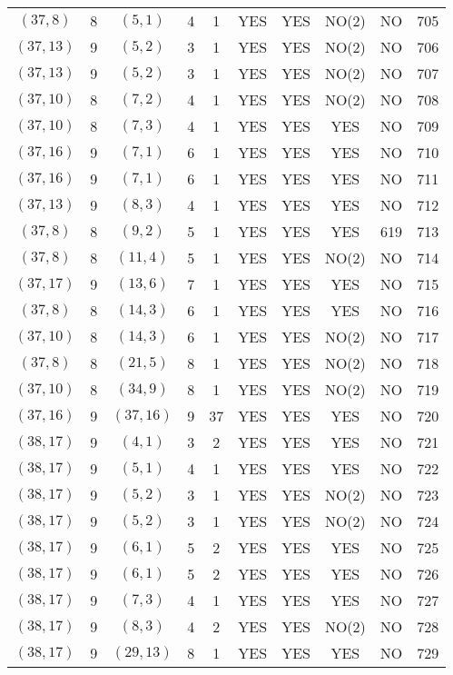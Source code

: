 \begin{longtable}{|c|c|c|c|c|c|c|c|c|c|}
$(37, 8)$ & 8 & $(5, 1)$ & 4 & 1 & YES & YES & NO(2) & NO & 705\\
$(37, 13)$ & 9 & $(5, 2)$ & 3 & 1 & YES & YES & NO(2) & NO & 706\\
$(37, 13)$ & 9 & $(5, 2)$ & 3 & 1 & YES & YES & NO(2) & NO & 707\\
$(37, 10)$ & 8 & $(7, 2)$ & 4 & 1 & YES & YES & NO(2) & NO & 708\\
$(37, 10)$ & 8 & $(7, 3)$ & 4 & 1 & YES & YES & YES & NO & 709\\
$(37, 16)$ & 9 & $(7, 1)$ & 6 & 1 & YES & YES & YES & NO & 710\\
$(37, 16)$ & 9 & $(7, 1)$ & 6 & 1 & YES & YES & YES & NO & 711\\
$(37, 13)$ & 9 & $(8, 3)$ & 4 & 1 & YES & YES & YES & NO & 712\\
$(37, 8)$ & 8 & $(9, 2)$ & 5 & 1 & YES & YES & YES & 619 & 713\\
$(37, 8)$ & 8 & $(11, 4)$ & 5 & 1 & YES & YES & NO(2) & NO & 714\\
$(37, 17)$ & 9 & $(13, 6)$ & 7 & 1 & YES & YES & YES & NO & 715\\
$(37, 8)$ & 8 & $(14, 3)$ & 6 & 1 & YES & YES & YES & NO & 716\\
$(37, 10)$ & 8 & $(14, 3)$ & 6 & 1 & YES & YES & NO(2) & NO & 717\\
$(37, 8)$ & 8 & $(21, 5)$ & 8 & 1 & YES & YES & NO(2) & NO & 718\\
$(37, 10)$ & 8 & $(34, 9)$ & 8 & 1 & YES & YES & NO(2) & NO & 719\\
$(37, 16)$ & 9 & $(37, 16)$ & 9 & 37 & YES & YES & YES & NO & 720\\
$(38, 17)$ & 9 & $(4, 1)$ & 3 & 2 & YES & YES & YES & NO & 721\\
$(38, 17)$ & 9 & $(5, 1)$ & 4 & 1 & YES & YES & YES & NO & 722\\
$(38, 17)$ & 9 & $(5, 2)$ & 3 & 1 & YES & YES & NO(2) & NO & 723\\
$(38, 17)$ & 9 & $(5, 2)$ & 3 & 1 & YES & YES & NO(2) & NO & 724\\
$(38, 17)$ & 9 & $(6, 1)$ & 5 & 2 & YES & YES & YES & NO & 725\\
$(38, 17)$ & 9 & $(6, 1)$ & 5 & 2 & YES & YES & YES & NO & 726\\
$(38, 17)$ & 9 & $(7, 3)$ & 4 & 1 & YES & YES & YES & NO & 727\\
$(38, 17)$ & 9 & $(8, 3)$ & 4 & 2 & YES & YES & NO(2) & NO & 728\\
$(38, 17)$ & 9 & $(29, 13)$ & 8 & 1 & YES & YES & YES & NO & 729\\

\end{longtable}
